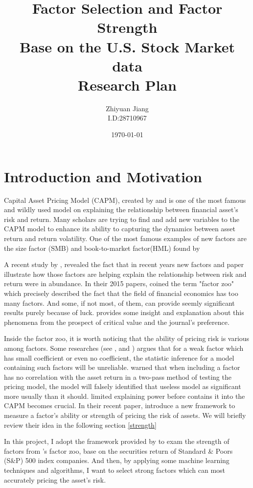 \documentclass[12pt]{article}
\title{Factor Selection and Factor Strength\\
\large Base on the U.S. Stock Market data\\
Research Plan }
\author{Zhiyuan Jiang\\I.D:28710967}
\date{\today}
\begin{document}
	\maketitle	
	\newpage
	\tableofcontents
	\newpage
	\section{Introduction and Motivation} \label{Intro}
Capital Asset Pricing Model (CAPM), created by  and  is one of the most famous and wildly used model on explaining the relationship between financial asset's risk and return.
Many scholars are trying to find and add new variables to the CAPM model to enhance its ability to capturing the dynamics  between asset return and return volatility. 
One of the most famous examples of new factors are the size factor (SMB) and book-to-market factor(HML) found by  

A recent study by , revealed the fact that in recent years new factors and paper illustrate how those factors are helping explain the relationship between risk and return were in abundance.
In their 2015 papers, \citeauthor{Harvey2015}  coined the term "factor zoo" which precisely described the fact that the field of financial economics has too many factors. 
And some, if not most, of them, can provide seemly significant results purely because of luck.
 provides some insight and explanation about this phenomena from the prospect of critical value and the journal's preference. 

Inside the factor zoo, it is worth noticing that the ability of pricing risk is various among factors. 
Some researches (see , and ) argues that for a weak factor which has small coefficient or even no coefficient, the statistic inference for a model containing such factors will be unreliable.
 warned that when including a factor has no correlation with the asset return in a two-pass method of testing the pricing model, the model will falsely identified that useless model as significant more usually than it should. 
 limited explaining power before contains it into the CAPM becomes crucial.
In their recent paper,  introduce a new framework to measure a factor's ability or strength of pricing the risk of  assets.
We will briefly review their idea in the following section \ref{strength}

In this project, I adopt the framework provided by  to exam the strength of factors from \citeauthor{Harvey2019}'s factor zoo, base on the securities return of Standard \& Poors (S\&P) 500 index companies. 
And then, by applying some machine learning techniques and algorithms,  I want to select strong factors which can most accurately pricing the asset's risk.
\end{document}
